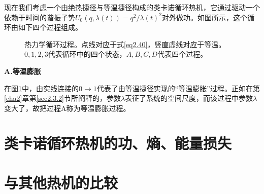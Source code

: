 \qquad 现在我们考虑一个由绝热捷径与等温捷径构成的类卡诺循环热机，它通过驱动一个依赖于时间的谐振子势$U_{0}(q, \lambda(t))= q^{2}/{\lambda(t)}^2 $对外做功。如图所示，这个循环由如下四个过程组成。

\begin{figure}[!htbp]
    \centering
    \def\svgwidth{0.6\columnwidth}
    
    \caption{热力学循环过程。点线对应于式\eqref{eq2.40}，竖直虚线对应于等温。$0,1,2,3$代表循环中的四个状态，$A,B,C,D$代表四个过程。}
    \label{p3.1}
\end{figure}


\begin{center}
    {\bfseries A.等温膨胀}
\end{center}

在图\ref{p3.1}中，由实线连接的$0 \to 1$代表了由等温捷径实现的“等温膨胀”过程。正如在第\ref{cha2}章第\ref{sec2.3.2}节所阐释的，参数$\lambda$表征了系统的空间尺度，而该过程中参数$\lambda$变大了，故把过程A称为等温膨胀过程。

\section{类卡诺循环热机的功、熵、能量损失}

\section{与其他热机的比较}